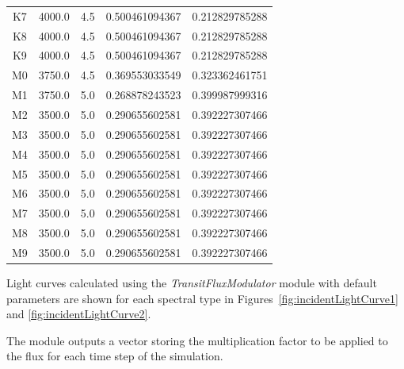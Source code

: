 \documentclass[11pt]{article}      %
\begin{document}
\begin{table}[hbtp]
\begin{center}
\begin{tabular}{| c | c | c | c | c |}
K7 & 4000.0 & 4.5 & 0.500461094367 & 0.212829785288 \\
K8 & 4000.0 & 4.5 & 0.500461094367 & 0.212829785288 \\
K9 & 4000.0 & 4.5 & 0.500461094367 & 0.212829785288 \\
M0 & 3750.0 & 4.5 & 0.369553033549 & 0.323362461751 \\
M1 & 3750.0 & 5.0 & 0.268878243523 & 0.399987999316 \\
M2 & 3500.0 & 5.0 & 0.290655602581 & 0.392227307466 \\
M3 & 3500.0 & 5.0 & 0.290655602581 & 0.392227307466 \\
M4 & 3500.0 & 5.0 & 0.290655602581 & 0.392227307466 \\
M5 & 3500.0 & 5.0 & 0.290655602581 & 0.392227307466 \\
M6 & 3500.0 & 5.0 & 0.290655602581 & 0.392227307466 \\
M7 & 3500.0 & 5.0 & 0.290655602581 & 0.392227307466 \\
M8 & 3500.0 & 5.0 & 0.290655602581 & 0.392227307466 \\
M9 & 3500.0 & 5.0 & 0.290655602581 & 0.392227307466 \\
    \hline
  \end{tabular}
  \label{tab:limb2}
  \end{center}
\end{table}

Light curves calculated using the {\it TransitFluxModulator} module with default parameters are shown for each spectral type in Figures~\ref{fig:incidentLightCurve1} and \ref{fig:incidentLightCurve2}.

The module outputs a vector storing the multiplication factor to be applied to the flux for each time step of the simulation.
\end{document}

